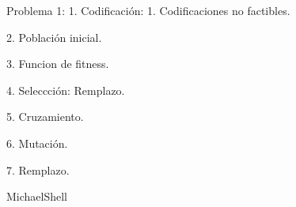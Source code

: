 \documentclass[9pt,technote]{IEEEtran}
\begin{document}
Problema 1:
	1. Codificación:
		1. Codificaciones no factibles.

	2. Población inicial.

	3. Funcion de fitness.

	4. Seleccción:
		Remplazo.

	5. Cruzamiento.

	6. Mutación.

	7. Remplazo.


\begin{IEEEbiography}[Hola]{MichaelShell}
\end{IEEEbiography}
\end{document}
